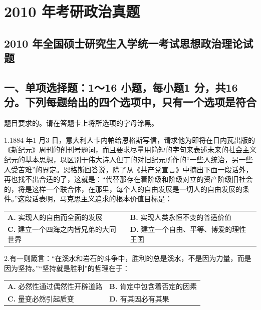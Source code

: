 \documentclass[UTF8,11pt]{ctexart}
\begin{document}
\section*{2010 年考研政治真题}
\subsection*{2010 年全国硕士研究生入学统一考试思想政治理论试题}

\subsection*{一、单项选择题：1～16 小题，每小题1 分，共16 分。下列每题给出的四个选项中，只有一个选项是符合}

题目要求的。请在答题卡上将所选项的字母涂黑。


1.1884 年1 月3 日，意大利人卡内帕给恩格斯写信，请求他为即将在日内瓦出版的《新纪元》周刊的创刊号题词，而且要求尽量用简短的字句来表述未来的社会主义纪元的基本思想，以区别于伟大诗人但丁的对旧纪元所作的“一些人统治，另一些人受苦难”的界定。恩格斯回答说，除了从《共产党宣言》中摘出下面一段话外，再也找不出合适的了，这就是：“代替那存在着阶级和阶级对立的资产阶级旧社会的，将是这样一个联合体，在那里，每个人的自由发展是一切人的自由发展的条件。”这段话表明，马克思主义追求的根本价值目标是：


\begin{center}\begin{tabular}{>{\raggedright\arraybackslash}p{\dimexpr(\linewidth-4\tabcolsep)/2\relax}>{\raggedright\arraybackslash}p{\dimexpr(\linewidth-4\tabcolsep)/2\relax}}
\textbf{A.} 实现人的自由而全面的发展 & \textbf{B.} 实现人类永恒不变的普适价值\\[.35em]
\textbf{C.} 建立一个四海之内皆兄弟的大同世界 & \textbf{D.} 建立一个自由、平等、博爱的理性王国\\[.35em]\end{tabular}\end{center}

2.有一则箴言：“在溪水和岩石的斗争中，胜利的总是溪水，不是因为力量，而是因为坚持。”“坚持就是胜利”的哲理在于：


\begin{center}\begin{tabular}{>{\raggedright\arraybackslash}p{\dimexpr(\linewidth-4\tabcolsep)/2\relax}>{\raggedright\arraybackslash}p{\dimexpr(\linewidth-4\tabcolsep)/2\relax}}
\textbf{A.} 必然性通过偶然性开辟道路 & \textbf{B.} 肯定中包含着否定的因素\\[.35em]
\textbf{C.} 量变必然引起质变 & \textbf{D.} 有其因必有其果\\[.35em]\end{tabular}\end{center}
\end{document}
